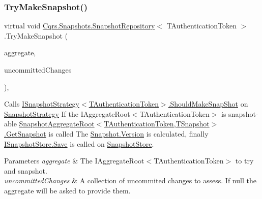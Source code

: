 \subsubsection{\texorpdfstring{Try\+Make\+Snapshot()}{TryMakeSnapshot()}}
{\footnotesize\ttfamily virtual void \hyperlink{classCqrs_1_1Snapshots_1_1SnapshotRepository}{Cqrs.\+Snapshots.\+Snapshot\+Repository}$<$ T\+Authentication\+Token $>$.Try\+Make\+Snapshot (\begin{DoxyParamCaption}\item[{\hyperlink{interfaceCqrs_1_1Domain_1_1IAggregateRoot}{I\+Aggregate\+Root}$<$ T\+Authentication\+Token $>$}]{aggregate,  }\item[{I\+Enumerable$<$ \hyperlink{interfaceCqrs_1_1Events_1_1IEvent}{I\+Event}$<$ T\+Authentication\+Token $>$$>$}]{uncommitted\+Changes }\end{DoxyParamCaption})\hspace{0.3cm}{\ttfamily [protected]}, {\ttfamily [virtual]}}



Calls \hyperlink{interfaceCqrs_1_1Snapshots_1_1ISnapshotStrategy_aeb5fc714ec8a5b60219426f3aabc0f6c_aeb5fc714ec8a5b60219426f3aabc0f6c}{I\+Snapshot\+Strategy$<$\+T\+Authentication\+Token$>$.\+Should\+Make\+Snap\+Shot} on \hyperlink{classCqrs_1_1Snapshots_1_1SnapshotRepository_a7d65b4df10d0b6f75c911a9b6d59b3ba_a7d65b4df10d0b6f75c911a9b6d59b3ba}{Snapshot\+Strategy} If the I\+Aggregate\+Root$<$\+T\+Authentication\+Token$>$ is snapshot-\/able \hyperlink{classCqrs_1_1Snapshots_1_1SnapshotAggregateRoot_a30ec8fe3a09fec8238c5921c629a5ac1_a30ec8fe3a09fec8238c5921c629a5ac1}{Snapshot\+Aggregate\+Root$<$\+T\+Authentication\+Token,\+T\+Snapshot$>$.\+Get\+Snapshot} is called The \hyperlink{classCqrs_1_1Snapshots_1_1Snapshot_a59c0a399430e5f4a1b27d999c3bb5d4f_a59c0a399430e5f4a1b27d999c3bb5d4f}{Snapshot.\+Version} is calculated, finally \hyperlink{interfaceCqrs_1_1Snapshots_1_1ISnapshotStore_a6e99c620115ce8a0648a83bf2ce05527_a6e99c620115ce8a0648a83bf2ce05527}{I\+Snapshot\+Store.\+Save} is called on \hyperlink{classCqrs_1_1Snapshots_1_1SnapshotStore}{Snapshot\+Store}. 


\begin{DoxyParams}{Parameters}
{\em aggregate} & The I\+Aggregate\+Root$<$\+T\+Authentication\+Token$>$ to try and snapshot.\\
\hline
{\em uncommitted\+Changes} & A collection of uncommited changes to assess. If null the aggregate will be asked to provide them.\\
\hline
\end{DoxyParams}
\mbox{\label{classCqrs_1_1Snapshots_1_1SnapshotRepository_a1328c103474b2b394b7af61a24455a65_a1328c103474b2b394b7af61a24455a65}} 
